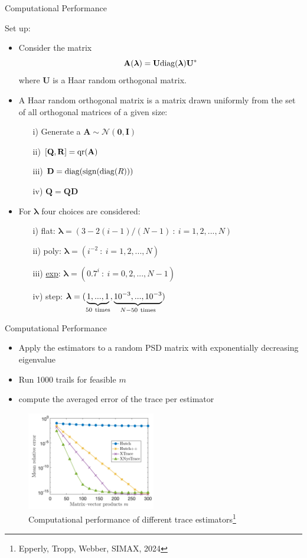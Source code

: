 \documentclass{beamer}
\newcommand{\bgk}[1]{\boldsymbol{#1}}
\newcommand{\bzero}{\bgk{0}}
\newcommand{\blambda}{\bgk{\lambda}}
\newcommand{\bvec}[1]{\mathbf{#1}}
\newcommand{\vA}{\bvec{A}}
\newcommand{\vD}{\bvec{D}}
\newcommand{\vI}{\bvec{I}}
\newcommand{\vQ}{\bvec{Q}}
\newcommand{\vR}{\bvec{R}}
\newcommand{\vU}{\bvec{U}}
\newcommand{\bitem}{\item[$\bullet$]}
\begin{document}
\begin{frame}{Computational Performance}

Set up:
\begin{itemize}
    \bitem Consider the matrix $$
    \vA (\blambda) = \vU {\rm diag}(\blambda) \vU^*
    $$ 
    where $\vU$ is a Haar random orthogonal matrix.
    \bitem A Haar random orthogonal matrix is a matrix drawn uniformly from the set of all orthogonal matrices of a given size:\\
    \begin{itemize}
        \item[i)] Generate a $\vA \sim \mathcal{N}(\bzero, \vI)$
        \item[ii)] $[\vQ,\vR] = {\rm qr}(\vA)$
        \item[iii)] $\vD = {\rm diag}({\rm sign}({\rm diag}(R)))$
        \item[iv)] $\vQ = \vQ  \vD$
    \end{itemize}
    \bitem For $\blambda$ four choices are considered:
    \begin{itemize}
        \item[i)] flat: $\blambda = (3-2(i-1)/(N-1)~:~ i = 1,2,...,N)$ 
        \item[ii)] poly: $\blambda = (i^{-2}~:~ i = 1,2,...,N)$
        \item[iii)] \underline{exp}: $\blambda = (0.7^i~:~ i = 0,2,...,N-1)$
        \item[iv)] step: 
        $\blambda = (\underbrace{1,...,1}_{50{\rm~times}}, \underbrace{10^{-3},...,10^{-3}}_{N-50{\rm~times}})$
    \end{itemize}
\end{itemize}
\end{frame}

\begin{frame}{Computational Performance}

\begin{itemize}
    \bitem Apply the estimators to a random PSD matrix with exponentially decreasing eigenvalue
    \bitem Run 1000 trails for feasible $m$
    \bitem compute the averaged error of the trace per estimator
\end{itemize}

\begin{figure}
    \centering
\includegraphics[width = 0.5\textwidth]{Graphics/TraceEstimators.png}
\caption{Computational performance of different trace estimators\footnote{Epperly, Tropp, Webber, SIMAX, 2024}}
\end{figure}


    
\end{frame}
\end{document}

